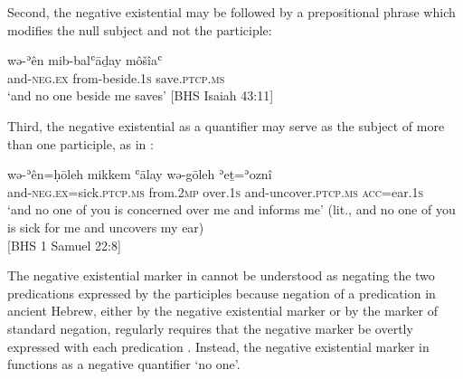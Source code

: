 ﻿\documentclass[output=paper]{langsci/langscibook}
\begin{document}
Second, the negative existential may be followed by a prepositional phrase
which modifies the null subject and not the participle:
%
\begin{exe}\ex \label{ex:heb-none-but-me}
    \gll wə-ʾên mib-balʿāḏay môšîaʿ \\
and-\textsc{neg.ex}   from-beside.\textsc{1s}   save.\textsc{ptcp.ms} \\
    \glt `and no one beside me saves' [BHS Isaiah
43:11]
    \end{exe}
%
Third, the negative existential as a quantifier may serve as the subject of
more than one participle, as in :
%
\begin{exe}\ex \label{ex:heb-concerned}
    \gll wǝ-ʾên=ḥōleh mikkem ʿālay  wǝ-gōleh ʾeṯ=ʾoznî \\
and-\textsc{neg.ex}=sick.\textsc{ptcp.ms}   from.\textsc{2mp}
over.\textsc{1s}  and-uncover.\textsc{ptcp.ms}
\textsc{acc}=ear.\textsc{1s} \\
    \glt
`and no one of you is concerned over me and informs me' (lit., and no one
of you is sick for me and uncovers my ear)\\
[BHS 1 Samuel 22:8]
    \end{exe}
%
The negative existential
marker in  cannot be understood as negating the two
predications expressed by the participles because 
negation of a predication in ancient Hebrew, either by the negative
existential marker or by the marker of standard negation, regularly
requires that the negative marker be overtly expressed with each
 predication  \parencite[for the ways in which negation in poetry may differ from
 prose in this regard, see][]{Miller2005}. Instead, the negative
existential marker in  functions as a negative quantifier `no one'.
\end{document}
